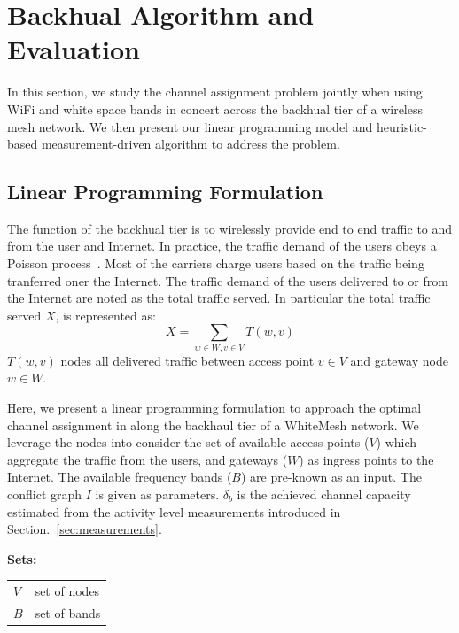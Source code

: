 \section{Backhual Algorithm and Evaluation}
\label{sec:whitemesh}

In this section, we study the channel assignment problem jointly when using WiFi and white space 
bands in concert across the backhual tier of a wireless mesh network. We then present our linear programming model and 
heuristic-based measurement-driven algorithm to address the problem. 
 
\subsection{Linear Programming Formulation}
\label{subsec:linearopt}

The function of the backhual tier is to wirelessly provide end to end traffic to and from the user and Internet.
In practice, the traffic demand of the users obeys a Poisson process~\cite{saaty1961elements}. 
Most of the carriers charge users based on the traffic being tranferred oner the Internet. 
The traffic demand of the users delivered to or from the Internet are noted as the total traffic served. 
In particular the total traffic served $X$, is represented as:
\begin{equation}
\label{eq:goodput}
X=\sum_{w \in W, v \in V}T(w,v)
\end{equation}
$T(w,v)$ nodes all delivered traffic between access point $v \in V$ and gateway node $w \in W$.

Here, we present a linear programming formulation to approach the optimal channel assignment in along the backhaul 
tier of a WhiteMesh network. 
We leverage the nodes into consider the set of available access points ($V$) which aggregate the traffic from the users, 
and gateways ($W$) as ingress points to the Internet. The available frequency bands ($B$) are pre-known 
as an input. The conflict graph $I$ is given as parameters. 
$\delta_b$ is the achieved channel capacity estimated from the  activity level measurements 
introduced in Section.~\ref{sec:measurements}.


\noindent
{\bf Sets:}
\begin{tabular}{ll}
$V$ & set of nodes \\
$B$ & set of bands \\
\end{tabular}

